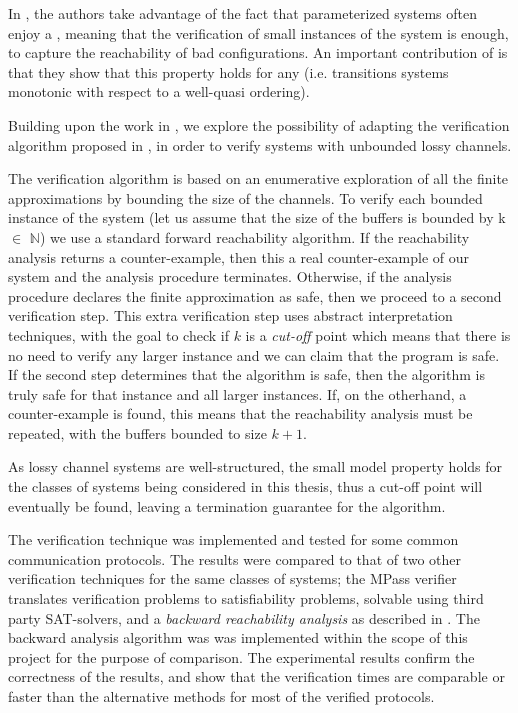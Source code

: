 In \cite{parosh}, the authors take advantage of the fact that parameterized systems often enjoy a , meaning that the verification of small instances of the system is enough, to capture the reachability of bad configurations. An important contribution of \cite{parosh} is that they show that this property holds for any \cite{abdulla2010} (i.e. transitions systems monotonic with respect to a well-quasi ordering).


Building upon the work in \cite{parosh}, we explore the possibility of adapting the verification algorithm proposed in \cite{parosh}, in order to verify systems with unbounded lossy channels.

The verification algorithm is based on an enumerative exploration of all the finite approximations by bounding the size of the channels. To verify each bounded instance of the system (let us assume that the size of the buffers is bounded by k $\in$ $\mathds{N}$) we use a standard forward reachability algorithm. If the reachability analysis returns a counter-example, then this a real counter-example of our system and the analysis procedure terminates. Otherwise, if the analysis procedure declares the finite approximation as safe, then we proceed to a second verification step. This extra verification step uses abstract interpretation techniques\cite{cousot1977}\cite{cousot1979}, with the goal to check if $k$ is a \emph{cut-off} point which means that there is no need to verify any larger instance and we can claim that the program is safe. If the second step determines that the algorithm is safe, then the algorithm is truly safe for that instance and all larger instances. If, on the otherhand, a counter-example is found, this means that the reachability analysis must be repeated, with the buffers bounded to size $k+1$.

As lossy channel systems are well-structured, the small model property holds for the classes of systems being considered in this thesis, thus a cut-off point will eventually be found, leaving a termination guarantee for the algorithm.

The verification technique was implemented and tested for some common communication protocols. The results were compared to that of two other verification techniques for the same classes of systems; the MPass\cite{mpass} verifier translates verification problems to satisfiability problems, solvable using third party SAT-solvers, and a \emph{backward reachability analysis} as described in \cite{287591}. The backward analysis algorithm was was implemented within the scope of this project for the purpose of comparison. The experimental results confirm the correctness of the results, and show that the verification times are comparable or faster than the alternative methods for most of the verified protocols.


